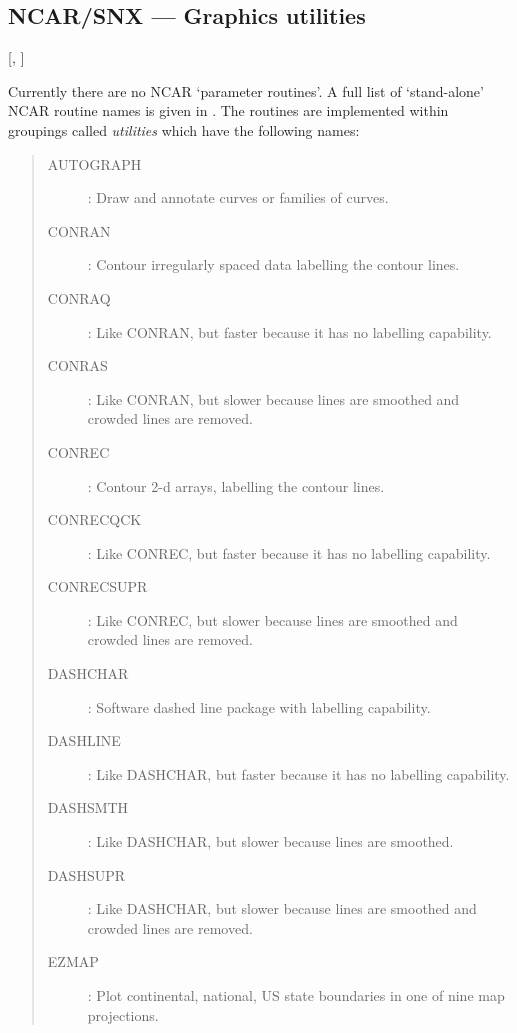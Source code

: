 \subsection{NCAR/SNX --- Graphics utilities} 

\vspace{-9mm}

\hfill [, ]

\vspace{2mm}

Currently there are no NCAR `parameter routines'.
A full list of `stand-alone' NCAR routine names is given in
.
The routines are implemented within groupings called {\em utilities} which
have the following names:

\begin{quote}
\begin{description}
\item [AUTOGRAPH] :
 Draw and annotate curves or families of curves.
\\
\item [CONRAN] : 
 Contour irregularly spaced data labelling the contour lines.
\item [CONRAQ] : 
 Like CONRAN, but faster because it has no labelling capability.
\item [CONRAS] : 
 Like CONRAN, but slower because lines are smoothed and crowded lines are
 removed.
\\
\item [CONREC] : 
 Contour 2-d arrays, labelling the contour lines.
\item [CONRECQCK] : 
 Like CONREC, but faster because it has no labelling capability.
\item [CONRECSUPR] : 
 Like CONREC, but slower because lines are smoothed and crowded lines are
 removed.
\\
\item [DASHCHAR] : 
 Software dashed line package with labelling capability.
\item [DASHLINE] : 
 Like DASHCHAR, but faster because it has no labelling capability.
\item [DASHSMTH] : 
 Like DASHCHAR, but slower because lines are smoothed.
\item [DASHSUPR] : 
 Like DASHCHAR, but slower because lines are smoothed and crowded lines are
 removed.
\\
\item [EZMAP] : 
 Plot continental, national, US state boundaries in one of nine map
 projections.

\end{description}
\end{quote}
